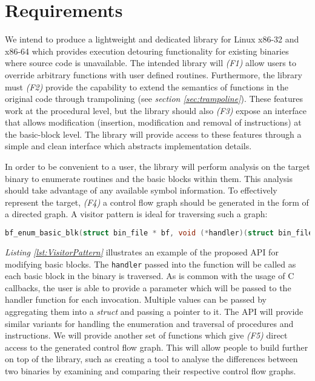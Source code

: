 \section{Requirements}
\label{sec:Requirements}

We intend to produce a lightweight and dedicated library for Linux x86-32 and x86-64 which provides execution detouring functionality for existing binaries where source code is unavailable. The intended library will \emph{(F1)} allow users to override arbitrary functions with user defined routines. Furthermore, the library must  \emph{(F2)} provide the capability to extend the semantics of functions in the original code through trampolining (see \emph{section \ref{sec:trampoline}}). These features work at the procedural level, but the library should also \emph{(F3)} expose an interface that allows modification (insertion, modification and removal of instructions) at the basic-block level. The library will provide access to these features through a simple and clean interface which abstracts implementation details.

In order to be convenient to a user, the library will perform analysis on the target binary to enumerate routines and the basic blocks within them. This analysis should take advantage of any available symbol information. To effectively represent the target, \emph{(F4)} a control flow graph should be generated in the form of a directed graph. A visitor pattern is ideal for traversing such a graph:

\begin{lstlisting}[language=C,caption={API for traversal of control flow graph},label={lst:VisitorPattern}]
bf_enum_basic_blk(struct bin_file * bf, void (*handler)(struct bin_file *, struct bf_basic_blk *, void *), void * param);
\end{lstlisting}

\emph{Listing \ref{lst:VisitorPattern}} illustrates an example of the proposed API for modifying basic blocks. The \texttt{handler} passed into the function will be called as each basic block in the binary is traversed. As is common with the usage of C callbacks, the user is able to provide a parameter which will be passed to the handler function for each invocation. Multiple values can be passed by aggregating them into a \emph{struct} and passing a pointer to it. The API will provide similar variants for handling the enumeration and traversal of procedures and instructions. We will provide another set of functions which give \emph{(F5)} direct access to the generated control flow graph. This will allow people to build further on top of the library, such as creating a tool to analyse the differences between two binaries by examining and comparing their respective control flow graphs.

